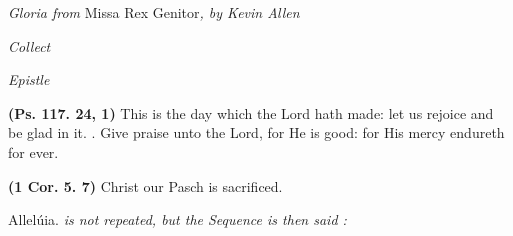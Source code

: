 \documentclass[11pt]{article} %
\begin{document}
\emph{Gloria from} Missa Rex Genitor\emph{, by Kevin Allen}

\emph{Collect}

\emph{Epistle}

\vskip10pt

\def\greinitialformat#1{%
{\fontsize{34}{34}\selectfont #1}%
}




\textbf{(Ps. 117. 24, 1)} This is the day which the Lord hath made: let us rejoice and be glad in it. \Vbar{}. Give praise unto the Lord, for He is good: for His mercy endureth for ever.

\vskip20pt

\def\greinitialformat#1{%
{\fontsize{34}{34}\selectfont #1}%
}




\textbf{(1 Cor. 5. 7)} Christ our Pasch is sacrificed.

Allelúia. \emph{is not repeated, but the Sequence is then said :}
\vskip10pt
\end{document}
